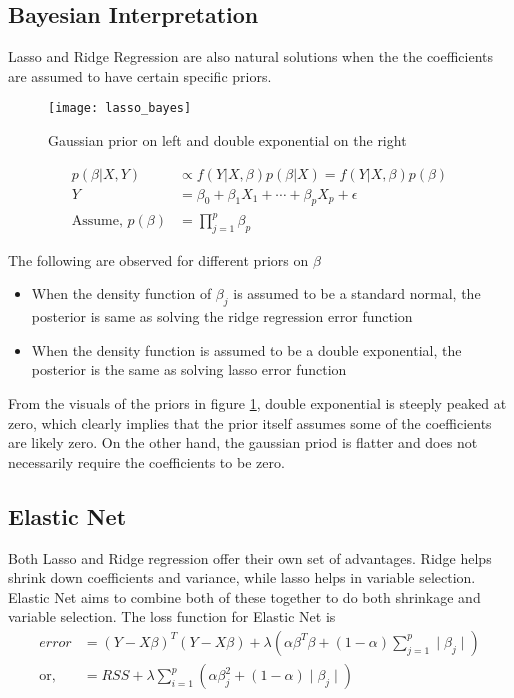 \documentclass[../statistical_learning_notes.tex]{subfiles}
\begin{document}
    \subsection{Bayesian Interpretation}
    Lasso and Ridge Regression are also natural solutions when the the coefficients are assumed to have certain specific priors.\newline
    \begin{figure}[h]
        \texttt{[image: lasso\_bayes]}
        \centering
        \caption {Gaussian prior on left and double exponential on the right}
        \label{fig:lasso_bayes}
    \end{figure}
    
    \begin{align*}
        p(\beta|X,Y) &\propto f(Y|X,\beta)p(\beta|X) = f(Y|X,\beta)p(\beta) \tag*{assuming X is constant}\\
        Y &= \beta_{0} + \beta_{1}X_{1} + \cdots + \beta_{p}X_{p} + \epsilon\\
        \text{Assume, } p(\beta) &= \prod_{j=1}^{p} \beta_{p} \tag*{for some density function $g$}  
    \end{align*}

    The following are observed for different priors on $\beta$

    \begin{itemize}
        \item When the density function of $\beta_{j}$ is assumed to be a standard normal, the posterior is same as solving the ridge regression error function
        \item When the density function is assumed to be a double exponential, the posterior is the same as solving lasso error function
    \end{itemize}

    From the visuals of the priors in figure \ref{fig:lasso_bayes}, double exponential is steeply peaked at zero, which clearly implies that the prior itself assumes some of the coefficients are likely zero. On the other hand, the gaussian priod is flatter and does not necessarily require the coefficients to be zero.


    \subsection{Elastic Net}
    Both Lasso and Ridge regression offer their own set of advantages. Ridge helps shrink down coefficients and variance, while lasso helps in variable selection. Elastic Net aims to combine both of these together to do both shrinkage and variable selection. The loss function for Elastic Net is
    \begin{align*}
        error &= (Y-X\beta)^{T}(Y-X\beta) + \lambda(\alpha\beta^{T}\beta + (1-\alpha)\sum_{j=1}^{p}\mid \beta_{j} \mid)\\
        \text{or,} \quad &= RSS + \lambda\sum_{i=1}^{p} (\alpha \beta_{j}^{2} + (1-\alpha)\mid \beta_{j} \mid)
    \end{align*}
\end{document}
